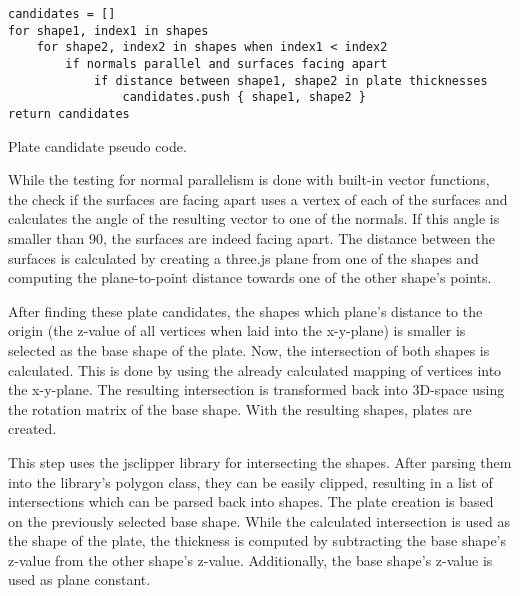 \documentclass[../ClassicThesis.tex]{subfiles}
\begin{document}
\begin{listing}[ht]
\begin{verbatim}
candidates = []
for shape1, index1 in shapes
    for shape2, index2 in shapes when index1 < index2
        if normals parallel and surfaces facing apart
            if distance between shape1, shape2 in plate thicknesses
                candidates.push { shape1, shape2 }
return candidates
\end{verbatim}
\caption{Plate candidate pseudo code.}
\label{lst:coffeescript}
\end{listing}

While the testing for normal parallelism is done with built-in vector functions, the check if the surfaces are facing apart uses a vertex of each of the surfaces and calculates the angle of the resulting vector to one of the normals. If this angle is smaller than 90\textdegree, the surfaces are indeed facing apart. The distance between the surfaces is calculated by creating a three.js plane from one of the shapes and computing the plane-to-point distance towards one of the other shape's points.

After finding these plate candidates, the shapes which plane's distance to the origin (the z-value of all vertices when laid into the x-y-plane) is smaller is selected as the base shape of the plate. Now, the intersection of both shapes is calculated. This is done by using the already calculated mapping of vertices into the x-y-plane. The resulting intersection is transformed back into 3D-space using the rotation matrix of the base shape. With the resulting shapes, plates are created.


This step uses the jsclipper library for intersecting the shapes. After parsing them into the library's polygon class, they can be easily clipped, resulting in a list of intersections which can be parsed back into shapes. The plate creation is based on the previously selected base shape. While the calculated intersection is used as the shape of the plate, the thickness is computed by subtracting the base shape's z-value from the other shape's z-value. Additionally, the base shape's z-value is used as plane constant.
\end{document}
